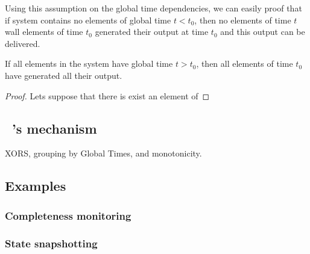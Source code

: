 Using this assumption on the global time dependencies, we can easily proof that if system contains no elements of global time $t < t_0$, then no elements of time $t$ wall elements of time $t_0$ generated their output at time $t_0$ and this output can be delivered.
\begin{lemma}
If all elements in the system have global time $t > t_0$, then all elements of time $t_0$ have generated all their output.
\end{lemma}
\begin{proof}
Lets suppose that there is exist an element of 
\end{proof}

\subsection{\tracker\ 's mechanism}
XORS, grouping by Global Times, and monotonicity. 

\subsection{Examples}

\subsubsection{Completeness monitoring}

\subsubsection{State snapshotting}



